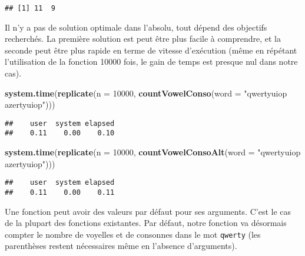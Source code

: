 \documentclass[]{book}
\newenvironment{Shaded}{\begin{snugshade}}{\end{snugshade}}
\newcommand{\KeywordTok}[1]{\textcolor[rgb]{0.13,0.29,0.53}{\textbf{#1}}}
\newcommand{\DataTypeTok}[1]{\textcolor[rgb]{0.13,0.29,0.53}{#1}}
\newcommand{\DecValTok}[1]{\textcolor[rgb]{0.00,0.00,0.81}{#1}}
\newcommand{\StringTok}[1]{\textcolor[rgb]{0.31,0.60,0.02}{#1}}
\newcommand{\NormalTok}[1]{#1}
\theoremstyle{definition}
\theoremstyle{definition}
\theoremstyle{definition}
\theoremstyle{remark}
\begin{document}
\begin{verbatim}
## [1] 11  9
\end{verbatim}

Il n'y a pas de solution optimale dans l'absolu, tout dépend des
objectifs recherchés. La première solution est peut être plus facile à
comprendre, et la seconde peut être plus rapide en terme de vitesse
d'exécution (même en répétant l'utilisation de la fonction 10000 fois,
le gain de temps est presque nul dans notre cas).

\begin{Shaded}
\begin{Highlighting}[]
\KeywordTok{system.time}\NormalTok{(}\KeywordTok{replicate}\NormalTok{(}\DataTypeTok{n =} \DecValTok{10000}\NormalTok{, }\KeywordTok{countVowelConso}\NormalTok{(}\DataTypeTok{word =} \StringTok{"qwertyuiop azertyuiop"}\NormalTok{)))}
\end{Highlighting}
\end{Shaded}

\begin{verbatim}
##    user  system elapsed 
##    0.11    0.00    0.10
\end{verbatim}

\begin{Shaded}
\begin{Highlighting}[]
\KeywordTok{system.time}\NormalTok{(}\KeywordTok{replicate}\NormalTok{(}\DataTypeTok{n =} \DecValTok{10000}\NormalTok{, }\KeywordTok{countVowelConsoAlt}\NormalTok{(}\DataTypeTok{word =} \StringTok{"qwertyuiop azertyuiop"}\NormalTok{)))}
\end{Highlighting}
\end{Shaded}

\begin{verbatim}
##    user  system elapsed 
##    0.11    0.00    0.11
\end{verbatim}

Une fonction peut avoir des valeurs par défaut pour ses arguments. C'est
le cas de la plupart des fonctions existantes. Par défaut, notre
fonction va désormais compter le nombre de voyelles et de consonnes dans
le mot \texttt{qwerty} (les parenthèses restent nécessaires même en
l'absence d'arguments).
\end{document}
